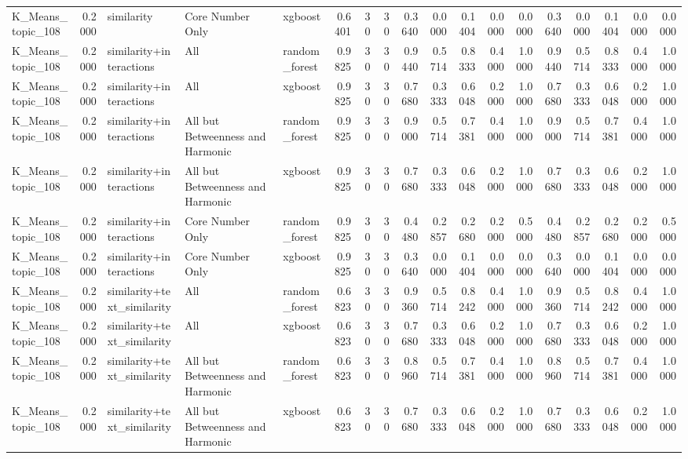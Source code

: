\begin{tabular}{lrlllrrrrrrrrrrrrr}
K_Means_topic_108 & 0.2000 & similarity & Core Number Only & xgboost & 0.6401 & 30 & 30 & 0.3640 & 0.0000 & 0.1404 & 0.0000 & 0.0000 & 0.3640 & 0.0000 & 0.1404 & 0.0000 & 0.0000 \\
K_Means_topic_108 & 0.2000 & similarity+interactions & All & random_forest & 0.9825 & 30 & 30 & 0.9440 & 0.5714 & 0.8333 & 0.4000 & 1.0000 & 0.9440 & 0.5714 & 0.8333 & 0.4000 & 1.0000 \\
K_Means_topic_108 & 0.2000 & similarity+interactions & All & xgboost & 0.9825 & 30 & 30 & 0.7680 & 0.3333 & 0.6048 & 0.2000 & 1.0000 & 0.7680 & 0.3333 & 0.6048 & 0.2000 & 1.0000 \\
K_Means_topic_108 & 0.2000 & similarity+interactions & All but Betweenness and Harmonic & random_forest & 0.9825 & 30 & 30 & 0.9000 & 0.5714 & 0.7381 & 0.4000 & 1.0000 & 0.9000 & 0.5714 & 0.7381 & 0.4000 & 1.0000 \\
K_Means_topic_108 & 0.2000 & similarity+interactions & All but Betweenness and Harmonic & xgboost & 0.9825 & 30 & 30 & 0.7680 & 0.3333 & 0.6048 & 0.2000 & 1.0000 & 0.7680 & 0.3333 & 0.6048 & 0.2000 & 1.0000 \\
K_Means_topic_108 & 0.2000 & similarity+interactions & Core Number Only & random_forest & 0.9825 & 30 & 30 & 0.4480 & 0.2857 & 0.2680 & 0.2000 & 0.5000 & 0.4480 & 0.2857 & 0.2680 & 0.2000 & 0.5000 \\
K_Means_topic_108 & 0.2000 & similarity+interactions & Core Number Only & xgboost & 0.9825 & 30 & 30 & 0.3640 & 0.0000 & 0.1404 & 0.0000 & 0.0000 & 0.3640 & 0.0000 & 0.1404 & 0.0000 & 0.0000 \\
K_Means_topic_108 & 0.2000 & similarity+text_similarity & All & random_forest & 0.6823 & 30 & 30 & 0.9360 & 0.5714 & 0.8242 & 0.4000 & 1.0000 & 0.9360 & 0.5714 & 0.8242 & 0.4000 & 1.0000 \\
K_Means_topic_108 & 0.2000 & similarity+text_similarity & All & xgboost & 0.6823 & 30 & 30 & 0.7680 & 0.3333 & 0.6048 & 0.2000 & 1.0000 & 0.7680 & 0.3333 & 0.6048 & 0.2000 & 1.0000 \\
K_Means_topic_108 & 0.2000 & similarity+text_similarity & All but Betweenness and Harmonic & random_forest & 0.6823 & 30 & 30 & 0.8960 & 0.5714 & 0.7381 & 0.4000 & 1.0000 & 0.8960 & 0.5714 & 0.7381 & 0.4000 & 1.0000 \\
K_Means_topic_108 & 0.2000 & similarity+text_similarity & All but Betweenness and Harmonic & xgboost & 0.6823 & 30 & 30 & 0.7680 & 0.3333 & 0.6048 & 0.2000 & 1.0000 & 0.7680 & 0.3333 & 0.6048 & 0.2000 & 1.0000 \\

\end{tabular}
